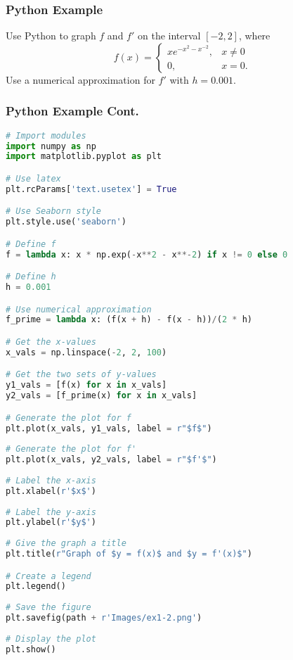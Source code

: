 \documentclass{beamer}
\begin{document}
\begin{frame}[t]
\frametitle{Python Example}
\begin{Example}
Use Python to graph $f$ and $f'$ on the interval $[-2, 2]$, where
$$
f(x) = \begin{cases} x e^{-x^2 - x^{-2}}, & x \neq 0\\ 0,	& x= 0.\end{cases}
$$
Use a numerical approximation for $f'$ with $h = 0.001$.
\end{Example}
\end{frame}

\begin{frame}[fragile]
\frametitle{Python Example Cont.}

\begin{multicols}{2}
\begin{lstlisting}[language=Python]
# Import modules 
import numpy as np
import matplotlib.pyplot as plt

# Use latex
plt.rcParams['text.usetex'] = True

# Use Seaborn style
plt.style.use('seaborn')

# Define f
f = lambda x: x * np.exp(-x**2 - x**-2) if x != 0 else 0

# Define h
h = 0.001

# Use numerical approximation
f_prime = lambda x: (f(x + h) - f(x - h))/(2 * h)

# Get the x-values
x_vals = np.linspace(-2, 2, 100)

# Get the two sets of y-values
y1_vals = [f(x) for x in x_vals]
y2_vals = [f_prime(x) for x in x_vals]

# Generate the plot for f
plt.plot(x_vals, y1_vals, label = r"$f$")
         
# Generate the plot for f'
plt.plot(x_vals, y2_vals, label = r"$f'$")  
         
# Label the x-axis
plt.xlabel(r'$x$')
         
# Label the y-axis
plt.ylabel(r'$y$')
         
# Give the graph a title
plt.title(r"Graph of $y = f(x)$ and $y = f'(x)$")

# Create a legend
plt.legend()
         
# Save the figure
plt.savefig(path + r'Images/ex1-2.png')
         
# Display the plot
plt.show()    
\end{lstlisting}
\end{multicols}
\end{frame}
\end{document}
